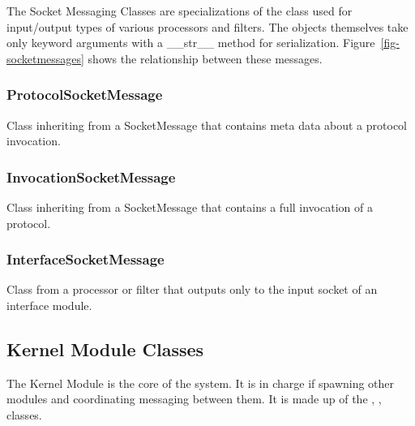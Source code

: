 \documentclass[titlepage]{article}
\begin{document}
The Socket Messaging Classes are specializations of the
 class used for input/output types of various
processors and filters.  The objects themselves take only keyword arguments
with a \_\_str\_\_ method for serialization.  Figure~\ref{fig-socketmessages}
shows the relationship between these messages.


\subsubsection{ProtocolSocketMessage}

Class inheriting from a SocketMessage that contains meta data about a protocol
invocation.


\subsubsection{InvocationSocketMessage}

Class inheriting from a SocketMessage that contains a full invocation of a protocol.


\subsubsection{InterfaceSocketMessage}

Class from a processor or filter that outputs only to the input socket of an
interface module.


\clearpage

\subsection{Kernel Module Classes
    \label{kernel_classes}
}

The Kernel Module is the core of the system.  It is in charge if spawning other
modules and coordinating messaging between them.  It is made up of the
, ,
 classes.

\end{document}
